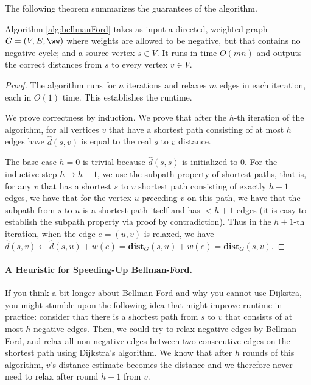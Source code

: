 The following theorem summarizes the guarantees of the algorithm.

\begin{theorem}
Algorithm \ref{alg:bellmanFord} takes as input a directed, weighted graph $G=(V,E, \ww)$ where weights are allowed to be negative, but that contains no negative cycle; and a source vertex $s \in V$. It runs in time $O(mn)$ and outputs the correct distances from $s$ to every vertex $v \in V$. 
\end{theorem}
\begin{proof}
The algorithm runs for $n$ iterations and relaxes $m$ edges in each iteration, each in $O(1)$ time. This establishes the runtime.

We prove correctness by induction. We prove that after the $h$-th iteration of the algorithm, for all vertices $v$ that have a shortest path consisting of at most $h$ edges have $\hat{d}(s,v)$ is equal to the real $s$ to $v$ distance.

The base case $h = 0$ is trivial because $\hat{d}(s,s)$ is initialized to $0$. For the inductive step $h \mapsto h+1$, we use the subpath property of shortest paths, that is, for any $v$ that has a shortest $s$ to $v$ shortest path consisting of exactly $h+1$ edges, we have that for the vertex $u$ preceding $v$ on this path, we have that the subpath from $s$ to $u$ is a shortest path itself and has $<h+1$ edges (it is easy to establish the subpath property via proof by contradiction). Thus in the $h+1$-th iteration, when the edge $e = (u,v)$ is relaxed, we have $\hat{d}(s, v) \gets \hat{d}(s, u) + w(e)= \mathbf{dist}_G(s,u) + w(e) = \mathbf{dist}_G(s,v)$.
\end{proof}

\paragraph{A Heuristic for Speeding-Up Bellman-Ford.} If you think a bit longer about Bellman-Ford and why you cannot use Dijkstra, you might stumble upon the following idea that might improve runtime in practice: consider that there is a shortest path from $s$ to $v$ that consists of at most $h$ negative edges. Then, we could try to relax negative edges by Bellman-Ford, and relax all non-negative edges between two consecutive edges on the shortest path using Dijkstra's algorithm.  We know that after $h$ rounds of this algorithm, $v$'s distance estimate becomes the distance and we therefore never need to relax after round $h+1$ from $v$. 

